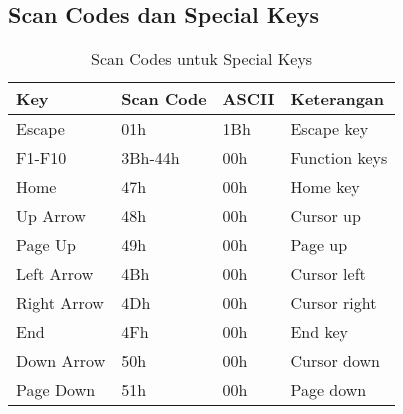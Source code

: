 \documentclass[../main.tex]{subfiles}
\begin{document}
        \subsection{Scan Codes dan Special Keys}
            \begin{table}[H]
                \centering
                \caption{Scan Codes untuk Special Keys}
                \begin{tabular}{|p{2cm}|p{2cm}|p{2cm}|p{7cm}|}
                    \hline
                    \textbf{Key} & \textbf{Scan Code} & \textbf{ASCII} & \textbf{Keterangan} \\
                    \hline
                    Escape & 01h & 1Bh & Escape key \\
                    \hline
                    F1-F10 & 3Bh-44h & 00h & Function keys \\
                    \hline
                    Home & 47h & 00h & Home key \\
                    \hline
                    Up Arrow & 48h & 00h & Cursor up \\
                    \hline
                    Page Up & 49h & 00h & Page up \\
                    \hline
                    Left Arrow & 4Bh & 00h & Cursor left \\
                    \hline
                    Right Arrow & 4Dh & 00h & Cursor right \\
                    \hline
                    End & 4Fh & 00h & End key \\
                    \hline
                    Down Arrow & 50h & 00h & Cursor down \\
                    \hline
                    Page Down & 51h & 00h & Page down \\
                    \hline
                \end{tabular}
            \end{table}
\end{document}
